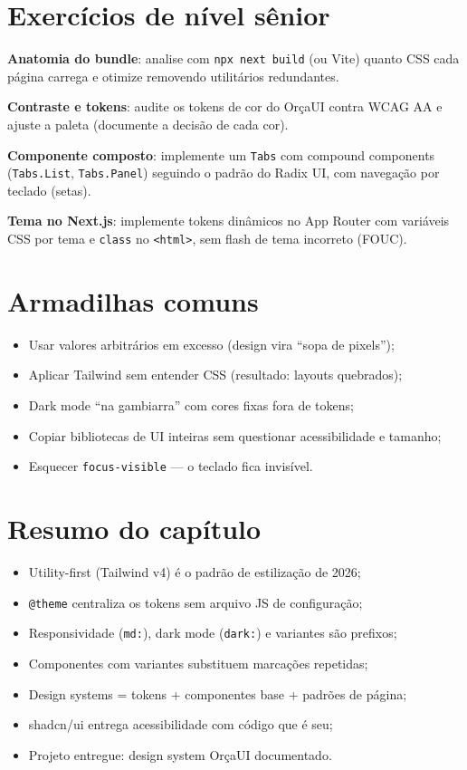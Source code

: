 \section{Exercícios de nível sênior}

\begin{seniores}
  \item \textbf{Anatomia do bundle}: analise com \texttt{npx next build} (ou Vite) quanto CSS cada página carrega e otimize removendo utilitários redundantes.
  \item \textbf{Contraste e tokens}: audite os tokens de cor do OrçaUI contra WCAG AA e ajuste a paleta (documente a decisão de cada cor).
  \item \textbf{Componente composto}: implemente um \texttt{Tabs} com compound components (\texttt{Tabs.List}, \texttt{Tabs.Panel}) seguindo o padrão do Radix UI, com navegação por teclado (setas).
  \item \textbf{Tema no Next.js}: implemente tokens dinâmicos no App Router com variáveis CSS por tema e \texttt{class} no \texttt{<html>}, sem flash de tema incorreto (FOUC).
\end{seniores}

\section{Armadilhas comuns}

\begin{itemize}[leftmargin=*, itemsep=0.4em]
  \item Usar valores arbitrários em excesso (design vira ``sopa de pixels'');
  \item Aplicar Tailwind sem entender CSS (resultado: layouts quebrados);
  \item Dark mode ``na gambiarra'' com cores fixas fora de tokens;
  \item Copiar bibliotecas de UI inteiras sem questionar acessibilidade e tamanho;
  \item Esquecer \texttt{focus-visible} — o teclado fica invisível.
\end{itemize}

\section{Resumo do capítulo}

\begin{itemize}[leftmargin=*, itemsep=0.3em]
  \item Utility-first (Tailwind v4) é o padrão de estilização de 2026;
  \item \texttt{@theme} centraliza os tokens sem arquivo JS de configuração;
  \item Responsividade (\texttt{md:}), dark mode (\texttt{dark:}) e variantes são prefixos;
  \item Componentes com variantes substituem marcações repetidas;
  \item Design systems = tokens + componentes base + padrões de página;
  \item shadcn/ui entrega acessibilidade com código que é seu;
  \item Projeto entregue: design system OrçaUI documentado.
\end{itemize}

